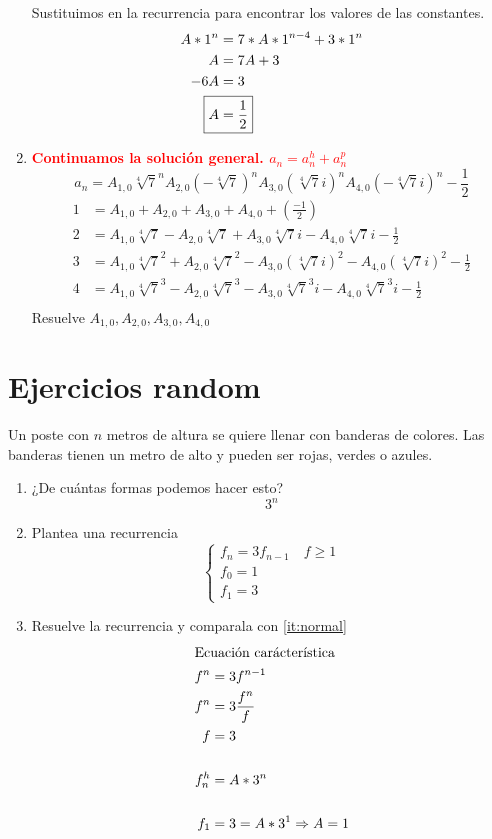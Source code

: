 \documentclass[../main.tex]{subfiles}
\begin{document}
\begin{enumerate}
		Sustituimos en la recurrencia para encontrar los valores de las
		constantes.
		\begin{align*}
			A*1^n &= 7*A*1^{n-4}+3*1^n\\
			A &= 7A+3\\
			-6A &= 3\\
			\Aboxed
			{
			A &= \frac{1}{2}
			}
		\end{align*}
	\item \textcolor{red}
		{
			\bfseries\boldmath%
			Continuamos la solución general.
			$a_n = a_n^h+a_n^p$
		}
		\[
			a_n =
			A_{1,0} \sqrt[4]{7}^n
			A_{2,0} \left(-\sqrt[4]{7}\right)^n
			A_{3,0} \left(\sqrt[4]{7}i\right)^n
			A_{4,0} \left(-\sqrt[4]{7}i\right)^n
			- \frac{1}{2}
		\]
		\begin{align*}
			1 &= A_{1,0}
			+
			A_{2,0}
			+
			A_{3,0}
			+
			A_{4,0}
			+
			\left( \frac{-1}{2} \right)\\
			2 &= A_{1,0} \sqrt[4]{7}
			-
			A_{2,0} \sqrt[4]{7}
			+
			A_{3,0} \sqrt[4]{7}i
			-
			A_{4,0} \sqrt[4]{7}i
			-
			\frac{1}{2}\\
			3 &= A_{1,0} \sqrt[4]{7}^2
			+
			A_{2,0} \sqrt[4]{7}^2
			-
			A_{3,0} \left(\sqrt[4]{7}i\right)^2
			-
			A_{4,0} \left(\sqrt[4]{7}i\right)^2
			-
			\frac{1}{2}\\
			4 &= A_{1,0} \sqrt[4]{7}^3
			-
			A_{2,0} \sqrt[4]{7}^3
			-
			A_{3,0} \sqrt[4]{7}^3i
			-
			A_{4,0} \sqrt[4]{7}^3i
			-
			\frac{1}{2}\\
		\end{align*}
		Resuelve $A_{1,0}, A_{2,0}, A_{3,0}, A_{4,0}$
\end{enumerate}
\section{Ejercicios random}%
\label{sec:ejercicios_random}

Un poste con $n$ metros de altura se quiere llenar con banderas de colores.
Las banderas tienen un metro de alto y pueden ser rojas, verdes o azules.
\begin{enumerate}
	\item\label{it:normal} ¿De cuántas formas podemos hacer esto?
		\[
			3^n
		\]
	\item Plantea una recurrencia
		\[
			\begin{cases}
				f_n = 3f_{n-1} \quad f \geq 1\\
				f_0 = 1\\
				f_1 = 3
			\end{cases}
		\]
	\item Resuelve la recurrencia y comparala con \ref{it:normal}
		\begin{align*}
			\intertext{Ecuación carácterística}
			f^n &= 3f^{n-1}\\
			f^n &= 3 \frac{f^n}{f} \\
			f &= 3\\
			\\
			f_n^h &= A*3^n\\
			\\
			f_1 &= 3 = A*3^1 \Rightarrow A=1
		\end{align*}
\end{enumerate}
\end{document}
